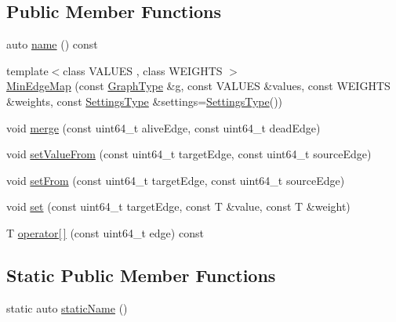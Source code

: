 \subsection*{Public Member Functions}
\begin{DoxyCompactItemize}
\item 
auto \hyperlink{classnifty_1_1graph_1_1agglo_1_1merge__rules_1_1MinEdgeMap_ad97848095253d6de2285a2bdec08314c}{name} () const
\item 
{\footnotesize template$<$class V\+A\+L\+U\+ES , class W\+E\+I\+G\+H\+TS $>$ }\\\hyperlink{classnifty_1_1graph_1_1agglo_1_1merge__rules_1_1MinEdgeMap_a33bca71988a8f653bcdd7a484108739c}{Min\+Edge\+Map} (const \hyperlink{classnifty_1_1graph_1_1agglo_1_1merge__rules_1_1MinEdgeMap_aad794908266d5bf105eea1c117ffb70f}{Graph\+Type} \&g, const V\+A\+L\+U\+ES \&values, const W\+E\+I\+G\+H\+TS \&weights, const \hyperlink{classnifty_1_1graph_1_1agglo_1_1merge__rules_1_1MinEdgeMap_ad0dd446b81440917b4dd852bd6bf1dac}{Settings\+Type} \&settings=\hyperlink{classnifty_1_1graph_1_1agglo_1_1merge__rules_1_1MinEdgeMap_ad0dd446b81440917b4dd852bd6bf1dac}{Settings\+Type}())
\item 
void \hyperlink{classnifty_1_1graph_1_1agglo_1_1merge__rules_1_1MinEdgeMap_ac1b3149beed05cf3510f4ae4ea8273f5}{merge} (const uint64\+\_\+t alive\+Edge, const uint64\+\_\+t dead\+Edge)
\item 
void \hyperlink{classnifty_1_1graph_1_1agglo_1_1merge__rules_1_1MinEdgeMap_a3840a1134b682940c11b1c0229afbe4b}{set\+Value\+From} (const uint64\+\_\+t target\+Edge, const uint64\+\_\+t source\+Edge)
\item 
void \hyperlink{classnifty_1_1graph_1_1agglo_1_1merge__rules_1_1MinEdgeMap_a964ddf7c1b16cabda988958bbaef0b35}{set\+From} (const uint64\+\_\+t target\+Edge, const uint64\+\_\+t source\+Edge)
\item 
void \hyperlink{classnifty_1_1graph_1_1agglo_1_1merge__rules_1_1MinEdgeMap_a619da5b29058e8ebf8ade3d5f40529fc}{set} (const uint64\+\_\+t target\+Edge, const T \&value, const T \&weight)
\item 
T \hyperlink{classnifty_1_1graph_1_1agglo_1_1merge__rules_1_1MinEdgeMap_ae7d43e009a1c11a8ffae7753a2313a0a}{operator\mbox{[}$\,$\mbox{]}} (const uint64\+\_\+t edge) const
\end{DoxyCompactItemize}
\subsection*{Static Public Member Functions}
\begin{DoxyCompactItemize}
\item 
static auto \hyperlink{classnifty_1_1graph_1_1agglo_1_1merge__rules_1_1MinEdgeMap_ae6b23b925f683793291244d61c8aac3a}{static\+Name} ()
\end{DoxyCompactItemize}


